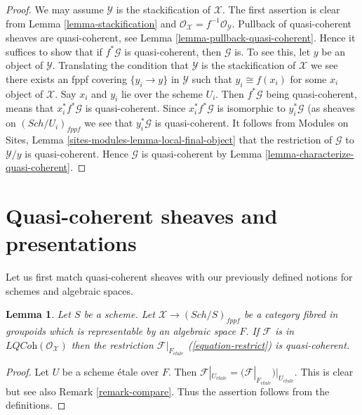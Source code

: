 \documentclass{stacks-project}
\theoremstyle{plain}
\newtheorem{lemma}[subsection]{Lemma}
\theoremstyle{definition}
\theoremstyle{remark}
\numberwithin{equation}{subsection}
\def\Sch{\mathit{Sch}}
\def\etale{{\acute{e}tale}}
\begin{document}
\begin{proof}
We may assume $\mathcal{Y}$ is the stackification of $\mathcal{X}$.
The first assertion is clear from
Lemma \ref{lemma-stackification}
and
$\mathcal{O}_\mathcal{X} = f^{-1}\mathcal{O}_\mathcal{Y}$.
Pullback of quasi-coherent sheaves are quasi-coherent, see
Lemma \ref{lemma-pullback-quasi-coherent}.
Hence it suffices to show that if $f^*\mathcal{G}$ is
quasi-coherent, then $\mathcal{G}$ is.
To see this, let $y$ be an object of $\mathcal{Y}$.
Translating the condition that $\mathcal{Y}$ is the stackification
of $\mathcal{X}$ we see there exists an fppf covering $\{y_i \to y\}$
in $\mathcal{Y}$ such that $y_i \cong f(x_i)$ for some
$x_i$ object of $\mathcal{X}$. Say $x_i$ and $y_i$ lie over the scheme $U_i$.
Then $f^*\mathcal{G}$ being quasi-coherent, means that $x_i^*f^*\mathcal{G}$
is quasi-coherent. Since $x_i^*f^*\mathcal{G}$ is isomorphic to
$y_i^*\mathcal{G}$ (as sheaves on $(\Sch/U_i)_{fppf}$ we
see that $y_i^*\mathcal{G}$ is quasi-coherent.
It follows from
Modules on Sites, Lemma \ref{sites-modules-lemma-local-final-object}
that the restriction of $\mathcal{G}$ to $\mathcal{Y}/y$ is
quasi-coherent. Hence $\mathcal{G}$ is quasi-coherent by
Lemma \ref{lemma-characterize-quasi-coherent}.
\end{proof}





\section{Quasi-coherent sheaves and presentations}
\label{section-quasi-coherent-presentation}

\noindent
Let us first match quasi-coherent sheaves with our previously defined
notions for schemes and algebraic spaces.

\begin{lemma}
\label{lemma-compare-locally-quasi-coherent}
Let $S$ be a scheme. Let $\mathcal{X} \to (\Sch/S)_{fppf}$ be a category
fibred in groupoids which is representable by an algebraic space $F$.
If $\mathcal{F}$ is in $\textit{LQCoh}(\mathcal{O}_\mathcal{X})$
then the restriction $\mathcal{F}|_{F_\etale}$ (\ref{equation-restrict}) 
is quasi-coherent.
\end{lemma}

\begin{proof}
Let $U$ be a scheme \'etale over $F$. Then
$\mathcal{F}|_{U_\etale} = (\mathcal{F}|_{F_\etale})|_{U_\etale}$.
This is clear but see also Remark \ref{remark-compare}.
Thus the assertion follows from the definitions.
\end{proof}
\end{document}
